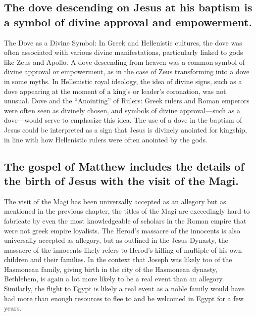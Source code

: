 \subsection{The dove descending on Jesus at his baptism is a symbol of divine approval and empowerment.}\label{subsec:the-dove-descending-on-jesus-at-his-baptism-is-a-symbol-of-divine-approval-and-empowerment.}

The Dove as a Divine Symbol: In Greek and Hellenistic cultures, the dove was often associated with various divine manifestations, particularly linked to gods like Zeus and Apollo.
A dove descending from heaven was a common symbol of divine approval or empowerment, as in the case of Zeus transforming into a dove in some myths.
In Hellenistic royal ideology, the idea of divine signs, such as a dove appearing at the moment of a king's or leader's coronation, was not unusual.
Dove and the ``Anointing'' of Rulers: Greek rulers and Roman emperors were often seen as divinely chosen, and symbols of divine approval---such as a dove---would serve to emphasize this idea.
The use of a dove in the baptism of Jesus could be interpreted as a sign that Jesus is divinely anointed for kingship, in line with how Hellenistic rulers were often anointed by the gods.

\subsection{The gospel of Matthew includes the details of the birth of Jesus with the visit of the Magi.}\label{subsec:the-gospel-of-matthew-includes-the-details-of-the-birth-of-jesus-with-the-visit-of-the-magi.}

The visit of the Magi has been universally accepted as an allegory but as mentioned in the previous chapter, the titles of the Magi are exceedingly hard to fabricate by even the most knowledgeable of scholars in the Roman empire that were not greek empire loyalists.
The Herod's massacre of the innocents is also universally accepted as allegory, but as outlined in the Jesus Dynasty, the massacre of the innocents likely refers to Herod's killing of multiple of his own children and their families.
In the context that Joseph was likely too of the Hasmonean family, giving birth in the city of the Hasmonean dynasty, Bethlehem, is again a lot more likely to be a real event than an allegory.
Similarly, the flight to Egypt is likely a real event as a noble family would have had more than enough resources to flee to and be welcomed in Egypt for a few years.

